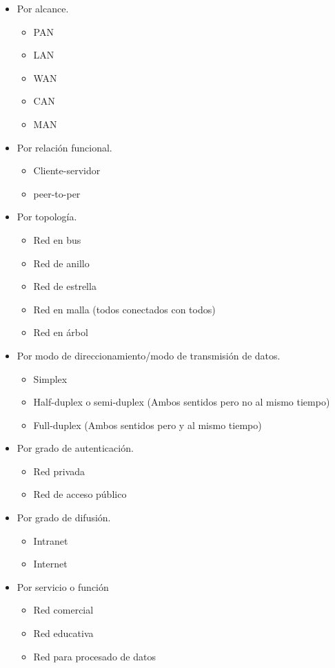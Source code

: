 \documentclass{article}
\begin{document}
\begin{itemize}
	\item
		Por alcance.

		\begin{itemize}
			\item
			PAN
			\item
			LAN
			\item
			WAN
			\item
			CAN
			\item
			MAN
		\end{itemize}
	\item
		Por relación funcional.

		\begin{itemize}
			\item
			Cliente-servidor
			\item
			peer-to-per
		\end{itemize}
	\item
		Por topología.

		\begin{itemize}
			\item
			Red en bus
			\item
			Red de anillo
			\item
			Red de estrella
			\item
			Red en malla (todos conectados con todos)
			\item
			Red en árbol
		\end{itemize}
	\item
		Por modo de direccionamiento/modo de transmisión de datos.

		\begin{itemize}
			\item
			Simplex
			\item
			Half-duplex o semi-duplex (Ambos sentidos pero
			no al mismo tiempo)
			\item
			Full-duplex (Ambos sentidos pero y al mismo tiempo)
		\end{itemize}
	\item
		Por grado de autenticación.

		\begin{itemize}
			\item
			Red privada
			\item
			Red de acceso público
		\end{itemize}
	\item
		Por grado de difusión.

		\begin{itemize}
			\item
			Intranet
			\item
			Internet
		\end{itemize}
	\item
		Por servicio o función

		\begin{itemize}
			\item
			Red comercial
			\item
			Red educativa
			\item
			Red para procesado de datos
		\end{itemize}
\end{itemize}
\end{document}
